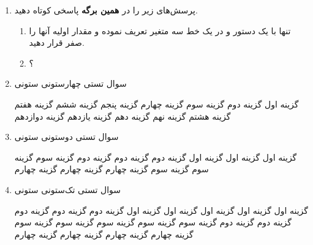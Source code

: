 \documentclass[a4paper,12pt]{unistyle}
\begin{document}
\MakeTitle
\begin{enumerate}

    \item
    پرسش‌های زیر را در \textbf{همین برگه} پاسخی کوتاه دهید. 
    \begin{enumerate}[itemtwocol]
        \parskip=20pt
        \item تنها با یک دستور و  در یک خط سه متغیر تعریف نموده و مقدار اولیه آنها را صفر قرار دهید.
        \item {}؟
    \end{enumerate}


    \item سوال تستی چهارستونی ستونی       
        \begin{choices}
            \choice گزینه اول
            \choice گزینه دوم
            \choice گزینه سوم
            \choice گزینه چهارم
            \choice گزینه پنجم
            \choice گزینه ششم
            \choice گزینه هفتم
            \choice گزینه هشتم
            \choice گزینه نهم
            \choice گزینه دهم
            \choice گزینه یازدهم
            \choice گزینه دوازدهم
        \end{choices}

        \item سوال تستی دوستونی ستونی
        \begin{choices}
            \choice گزینه اول  گزینه اول گزینه اول
            \choice گزینه دوم  گزینه دوم گزینه دوم
            \choice گزینه سوم  گزینه سوم گزینه سوم
            \choice گزینه چهارم گزینه چهارم گزینه چهارم
        \end{choices}

    \item سوال تستی تک‌ستونی ستونی
        \begin{choices}
            \choice گزینه اول گزینه اول گزینه اول گزینه اول گزینه اول
            \choice گزینه دوم گزینه دوم گزینه دوم گزینه دوم گزینه دوم
            \choice گزینه سوم گزینه سوم گزینه سوم گزینه سوم گزینه سوم
            \choice گزینه چهارم گزینه چهارم گزینه چهارم گزینه چهارم
        \end{choices}
\end{enumerate}


\sign
\vfill
\kalamehakim
\xepersianproof
\end{document}
